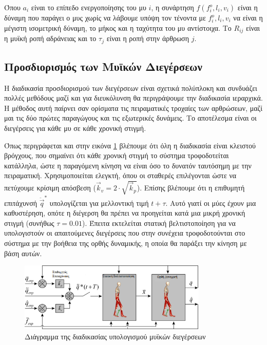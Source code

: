 Όπου $a_i$ είναι το επίπεδο ενεργοποίησης του μυ $i$, η συνάρτηση $f(f^{o}_{i}, l_{i}, v_{i})$ είναι η δύναμη που παράγει ο μυς χωρίς να λάβουμε υπόψη τον τένοντα με $f^{o}_{i}, l_{i}, v_{i}$ να είναι η μέγιστη ισομετρική δύναμη, το μήκος και η ταχύτητα του μυ αντίστοιχα. Το $R_{ij}$ είναι η μυϊκή ροπή αδράνειας και το $\tau_{j}$ είναι η ροπή στην άρθρωση $j$.

\subsection{Προσδιορισμός των Μυϊκών Διεγέρσεων}

Η διαδικασία προσδιορισμού των διεγέρσεων είναι σχετικά πολύπλοκη και συνδυάζει πολλές μεθόδους μαζί και για διευκόλυνση θα περιγράψουμε την διαδικασία ιεραρχικά. Η μέθοδος αυτή παίρνει σαν ορίσματα τις πειραματικές τροχαίες των αρθρώσεων, μαζί μαι τις δύο πρώτες παραγώγους και τις εξωτερικές δυνάμεις. Το αποτέλεσμα είναι οι διεγέρσεις για κάθε μυ σε κάθε χρονική στιγμή.

Όπως περιγράφεται και στην εικόνα \ref{fig:cmc-diagram} βλέπουμε ότι όλη η διαδικασία είναι κλειστού βρόγχους, που σημαίνει ότι κάθε χρονική στιγμή το σύστημα τροφοδοτείται κατάλληλα, ώστε η παραγόμενη κίνηση να είναι όσο το δυνατόν ταυτόσημη με την πειραματική. Χρησιμοποιείται  ελεγκτή, όπου οι σταθερές επιλέγονται ώστε να πετύχουμε κρίσιμη απόσβεση ($\overrightarrow{k}_v = 2 \cdot \sqrt{\overrightarrow{k}_p}$). Επίσης βλέπουμε ότι η επιθυμητή επιτάχυνσή $\ddot{\overrightarrow{q}}^{*}$ υπολογίζεται για μελλοντική τιμή $t + \tau $. Αυτό γιατί οι μύες έχουν μια καθυστέρηση, οπότε η διέγερση θα πρέπει να προηγείται κατά μια μικρή χρονική στιγμή (συνήθως $\tau = 0.01$). Έπειτα εκτελείται στατική βελτιστοποίηση για να υπολογιστούν οι απαιτούμενες διεγέρσεις που στην συνέχεια τροφοδοτούνται στο σύστημα με την βοήθεια της ορθής δυναμικής, η οποία θα παράξει την κίνηση με βάση αυτών.

\begin{figure}[H]
    \centering
    \includegraphics[width=0.8\textwidth, keepaspectratio]{fig/cmc-diagram.png}
    \caption{Διάγραμμα της διαδικασίας υπολογισμού μυϊκών διεγέρσεων \cite{thelen06}}
    \label{fig:cmc-diagram}
\end{figure}

